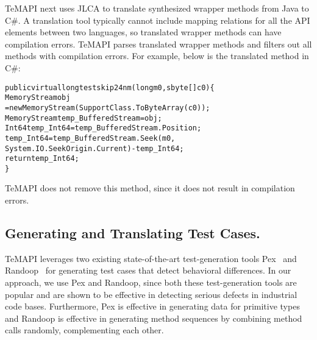 TeMAPI next uses JLCA to translate synthesized wrapper methods from Java to C\#. A translation tool typically cannot include mapping relations for all the API elements between two languages, so translated wrapper methods can have compilation errors. TeMAPI parses translated wrapper methods and filters out all methods with compilation errors. For example, below is the translated  method in C\#:

\begin{CodeOut}%
\begin{alltt}
public virtual long testskip24nm(long m0, sbyte[] c0)\{
  MemoryStream obj
    = new MemoryStream(SupportClass.ToByteArray(c0));
  MemoryStream temp_BufferedStream = obj;
  Int64 temp_Int64 = temp_BufferedStream.Position;
  temp_Int64 = temp_BufferedStream.Seek(m0,
    System.IO.SeekOrigin.Current) - temp_Int64;
  return temp_Int64;
\}
\end{alltt}
\end{CodeOut}%

TeMAPI does not remove this method, since it does not result in compilation errors.
 
\subsection{Generating and Translating Test Cases.}  TeMAPI leverages two existing state-of-the-art test-generation tools Pex~\citep{tillmann2008pex} and Randoop~\citep{pacheco2007feedback} for generating test cases that detect behavioral differences. In our approach, we use Pex and Randoop, since both these test-generation tools are popular and are shown to be effective in detecting serious defects in industrial code bases. Furthermore, Pex is effective in generating data for primitive types and Randoop is effective in generating method sequences by combining method calls randomly, complementing each other.

